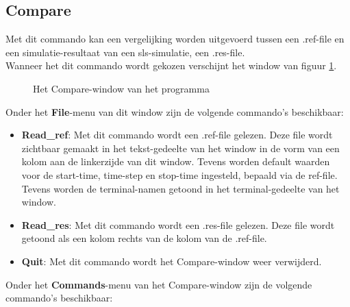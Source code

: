 \subsection{Compare}
Met dit commando kan een vergelijking worden uitgevoerd tussen een .ref-file en
een simulatie-resultaat van een sls-simulatie, een .res-file.\\
Wanneer het dit commando wordt gekozen verschijnt het window van
figuur \ref{compare-window}.

\begin{figure}[htb]
\centerline{}
\caption{Het Compare-window van het programma }
\label{compare-window}
\end{figure}

Onder het {\bf File}-menu van dit window zijn de volgende commando's beschikbaar:
\begin{itemize}
\item {\bf Read\_ref}: Met dit commando wordt een .ref-file gelezen. Deze file wordt
                zichtbaar gemaakt in het tekst-gedeelte van het window
                in de vorm van een kolom aan de lin\-kerzijde van dit window.
                Tevens worden default waarden voor de start-time, time-step en
                stop-time ingesteld, bepaald via de ref-file.
                Tevens worden de terminal-namen getoond in het
		terminal-gedeelte van het window.
\item {\bf Read\_res}: Met dit commando wordt een .res-file gelezen. Deze file
                wordt getoond als een kolom rechts van de kolom van de
                .ref-file.
\item {\bf Quit}: Met dit commando wordt het Compare-window weer verwijderd.
\end{itemize}
Onder het {\bf Commands}-menu van het Compare-window zijn de volgende commando's
beschikbaar:
